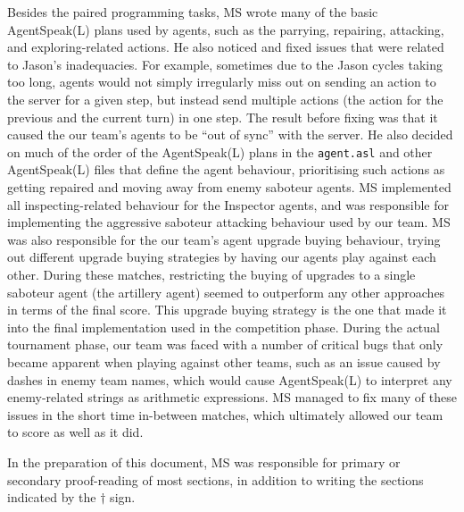 Besides the paired programming tasks, MS wrote many of the basic AgentSpeak(L) plans used by agents, such as the parrying, repairing, attacking, and exploring-related actions.
He also noticed and fixed issues that were related to Jason's inadequacies.
For example, sometimes due to the Jason cycles taking too long, agents would not simply irregularly miss out on sending an action to the server for a given step, but instead send multiple actions (the action for the previous and the current turn) in one step.
The result before fixing was that it caused the our team's agents to be \enquote{out of sync} with the server.
He also decided on much of the order of the AgentSpeak(L) plans in the \texttt{agent.asl} and other AgentSpeak(L) files that define the agent behaviour, prioritising such actions as getting repaired and moving away from enemy saboteur agents.
MS implemented all inspecting-related behaviour for the Inspector agents, and was responsible for implementing the aggressive saboteur attacking behaviour used by our team.
MS was also responsible for the our team's agent upgrade buying behaviour, trying out different upgrade buying strategies by having our agents play against each other.
During these matches, restricting the buying of upgrades to a single saboteur agent (the artillery agent) seemed to outperform any other approaches in terms of the final score.
This upgrade buying strategy is the one that made it into the final implementation used in the competition phase.
During the actual tournament phase, our team was faced with a number of critical bugs that only became apparent when playing against other teams, such as an issue caused by dashes in enemy team names, which would cause AgentSpeak(L) to interpret any enemy-related strings as arithmetic expressions.
MS managed to fix many of these issues in the short time in-between matches, which ultimately allowed our team to score as well as it did.

In the preparation of this document, MS was responsible for primary or secondary proof-reading of most sections, in addition to writing the sections indicated by the $\dagger$ sign.
